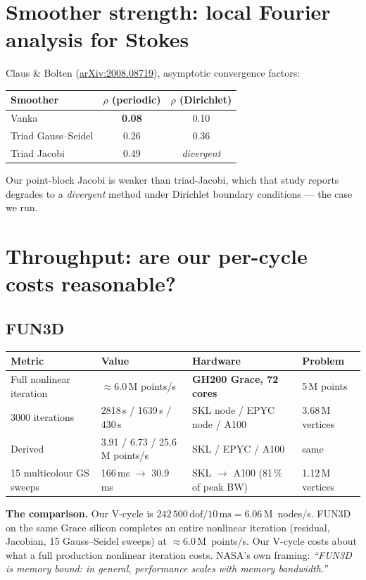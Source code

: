 \documentclass[11pt,a4paper]{article}
\begin{document}
\section{Smoother strength: local Fourier analysis for Stokes}
Claus \& Bolten (\href{https://arxiv.org/pdf/2008.08719}{arXiv:2008.08719}), asymptotic
convergence factors:
\begin{center}
\begin{tabular}{@{}lcc@{}}
\toprule
Smoother & $\rho$ (periodic) & $\rho$ (Dirichlet) \\
\midrule
Vanka & \textbf{0.08} & 0.10 \\
Triad Gauss--Seidel & 0.26 & 0.36 \\
Triad Jacobi & 0.49 & \emph{divergent} \\
\bottomrule
\end{tabular}
\end{center}
Our point-block Jacobi is weaker than triad-Jacobi, which that study reports degrades to a
\emph{divergent} method under Dirichlet boundary conditions --- the case we run.

\section{Throughput: are our per-cycle costs reasonable?}

\subsection{FUN3D}
\begin{center}
\begin{tabular}{@{}llll@{}}
\toprule
Metric & Value & Hardware & Problem \\
\midrule
Full nonlinear iteration & $\approx$6.0\,M points/s & \textbf{GH200 Grace, 72 cores} & 5\,M points \\
3000 iterations & 2818\,s / 1639\,s / 430\,s & SKL node / EPYC node / A100 & 3.68\,M vertices \\
Derived & 3.91 / 6.73 / 25.6\,M points/s & SKL / EPYC / A100 & same \\
15 multicolour GS sweeps & 166\,ms $\to$ 30.9\,ms & SKL $\to$ A100 (81\,\% of peak BW) & 1.12\,M vertices \\
\bottomrule
\end{tabular}
\end{center}
\textbf{The comparison.} Our V-cycle is $242\,500\,\mathrm{dof} / 10\,\mathrm{ms} =
6.06$\,M~nodes/s. FUN3D on the same Grace silicon completes an entire nonlinear iteration
(residual, Jacobian, 15 Gauss--Seidel sweeps) at $\approx 6.0$\,M~points/s. Our V-cycle costs
about what a full production nonlinear iteration costs. NASA's own framing: \emph{``FUN3D is
memory bound: in general, performance scales with memory bandwidth.''}
\end{document}
